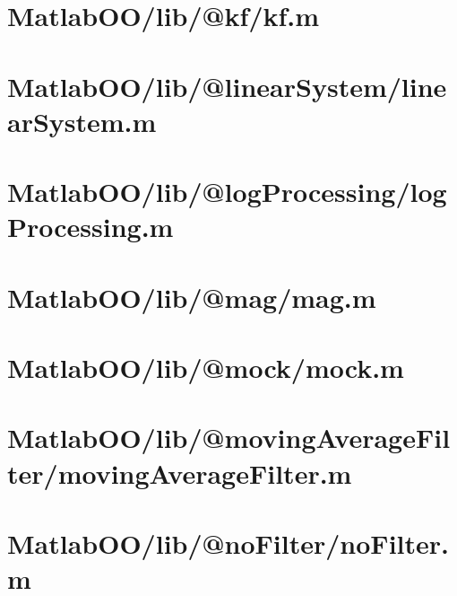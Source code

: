 \section{MatlabOO/lib/@kf/kf.m}\label{code:MatlabOO/lib/@kf/kf.m}


\pagebreak
\section{MatlabOO/lib/@linearSystem/linearSystem.m}\label{code:MatlabOO/lib/@linearSystem/linearSystem.m}


\pagebreak
\section{MatlabOO/lib/@logProcessing/logProcessing.m}\label{code:MatlabOO/lib/@logProcessing/logProcessing.m}


\pagebreak
\section{MatlabOO/lib/@mag/mag.m}\label{code:MatlabOO/lib/@mag/mag.m}


\pagebreak
\section{MatlabOO/lib/@mock/mock.m}\label{code:MatlabOO/lib/@mock/mock.m}


\pagebreak
\section{MatlabOO/lib/@movingAverageFilter/movingAverageFilter.m}\label{code:MatlabOO/lib/@movingAverageFilter/movingAverageFilter.m}


\pagebreak
\section{MatlabOO/lib/@noFilter/noFilter.m}\label{code:MatlabOO/lib/@noFilter/noFilter.m}


